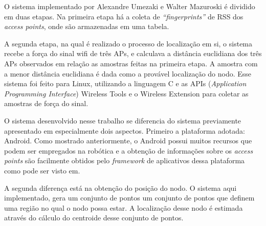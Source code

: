   O sistema implementado por Alexandre Umezaki e Walter Mazuroski é dividido em duas etapas. 
  Na primeira etapa há a coleta de \textit{``fingerprints''} de RSS dos \textit{access points}, onde são armazenadas em
  uma tabela.%
  
  A segunda etapa, na qual é realizado o processo de localização 
  em si, o sistema recebe a força do sinal wifi de três APs, e calculava a distância euclidiana dos 
  três APs observados em relação as amostras feitas na primeira etapa. 
  A amostra com a menor distância euclidiana é dada como a provável localização do nodo. 
  Esse sistema foi feito para Linux, utilizando a linguagem C
  e as APIs (\textit{Application Programming Interface}) Wireless Tools e o Wireless Extension\cite{apic}
 para coletar as amostras de força do sinal.
  
  O sistema desenvolvido nesse trabalho se diferencia do sistema previamente apresentado em
  especialmente dois aspectos. Primeiro a plataforma adotada: Android. Como mostrado anteriormente,
  o Android possui muitos recursos que podem ser empregados na robótica e a obtenção de informações 
  sobre os \textit{access points} são facilmente obtidos pelo \textit{framework} de aplicativos dessa plataforma como
  pode ser visto em\cite{getRss}.
  
  A segunda diferença está na obtenção do posição do nodo. O sistema aqui implementado, gera um conjunto de 
  pontos um conjunto de pontos que definem uma região no qual o nodo possa estar. A localização desse nodo 
  é estimada através do cálculo do centroide desse conjunto de pontos.
   
